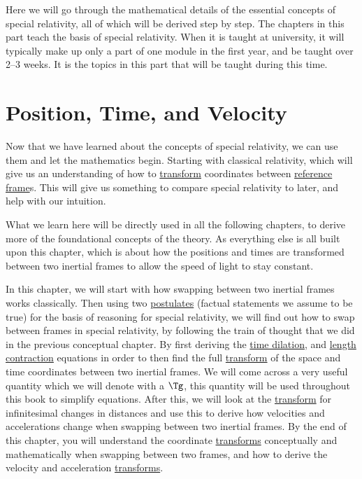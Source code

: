 Here we will go through the mathematical details of the essential concepts of special relativity, all of which will be derived step by step.
The chapters in this part teach the basis of special relativity.
When it is taught at university, it will typically make up only a part of one module in the first year, and be taught over 2–3 weeks.
It is the topics in this part that will be taught during this time.

\chapter{Position, Time, and Velocity} \label{ch: Position, Time and Velocity} %

Now that we have learned about the concepts of special relativity, we can use them and let the mathematics begin.
Starting with classical relativity, which will give us an understanding of how to \hyperlink{def-transform}{transform} coordinates between \hyperlink{def-Reference-frame}{reference frame}s.
This will give us something to compare special relativity to later, and help with our intuition.

What we learn here will be directly used in all the following chapters, to derive more of the foundational concepts of the theory.
As everything else is all built upon this chapter, which is about how the positions and times are transformed between two inertial frames to allow the speed of light to stay constant.

In this chapter, we will start with how swapping between two inertial frames works classically.
Then using two \hyperlink{def-postulates}{postulates} (factual statements we assume to be true) for the basis of reasoning for special relativity, we will find out how to swap between frames in special relativity, by following the train of thought that we did in the previous conceptual chapter.
By first deriving the \hyperlink{def-time-dilation}{time dilation}, and \hyperlink{def-length-contraction}{length contraction} equations in order to then find the full \hyperlink{def-transform}{transform} of the space and time coordinates between two inertial frames.
We will come across a very useful quantity which we will denote with a ${\Tg }$, this quantity will be used throughout this book to simplify equations.
After this, we will look at the \hyperlink{def-transform}{transform} for infinitesimal changes in distances and use this to derive how velocities and accelerations change when swapping between two inertial frames.
By the end of this chapter, you will understand the coordinate \hyperlink{def-transform}{transforms} conceptually and mathematically when swapping between two frames, and how to derive the velocity and acceleration \hyperlink{def-transform}{transforms}.


